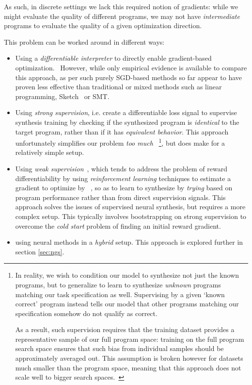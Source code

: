 \documentclass{article}
\begin{document}
As such, in discrete settings we lack this required notion of gradients:
while we might evaluate the quality of different programs,
we may not have \emph{intermediate} programs to evaluate the quality of a given optimization direction.

This problem can be worked around in different ways:
\begin{itemize}
    \item Using a \emph{differentiable interpreter} to directly enable gradient-based optimization.~\citep{forth,terpret,houdini,feser2016differentiable,rocktaschel2017end,abadi2019simple}
        However, while only empirical evidence is available to compare this approach, as per \citet{terpret} such purely SGD-based methods so far appear to have proven less effective than traditional or mixed methods such as linear programming, Sketch~\citep{solar2008program} or SMT.
    \item Using \emph{strong supervision}, i.e. create a differentiable loss signal
        to supervise synthesis training by checking if the synthesized program is \emph{identical} to the target program,
        rather than if it has \emph{equivalent behavior}.
        This approach unfortunately simplifies our problem \emph{too much}%
        ~\footnote{
            In reality, we wish to condition our model to synthesize not just the known programs,
            but to generalize to learn to synthesize \emph{unknown} programs matching our task specification as well.
            Supervising by a given `known correct' program instead tells our model that other programs matching our specification somehow do not qualify as correct.

            As a result, such supervision requires that the training dataset provides a representative sample of our full program space:
            training on the full program search space ensures that such bias from individual samples should be approximately averaged out.
            This assumption is broken however for datasets much smaller than the program space,
            meaning that this approach does not scale well to bigger search spaces.~\citep{nsps}
        }, but does make for a relatively simple setup.
    \item Using \emph{weak supervision}~\citep{mapo},
        which tends to address the problem of reward differentiability by using \emph{reinforcement learning} techniques to estimate a gradient to optimize by%
        ~\citep{chen2017towards,bunel2018leveraging,xu2019neural,camacho2019towards},
        so as to learn to synthesize by \emph{trying} based on program performance rather than from direct supervision signals.
        This approach solves the issues of supervised neural synthesis,
        but requires a more complex setup.
        This typically involves bootstrapping on strong supervision to overcome the \emph{cold start} problem of finding an initial reward gradient.
    \item using neural methods in a \emph{hybrid} setup. This approach is explored further in section \ref{sec:ngs}.
\end{itemize}
\end{document}
